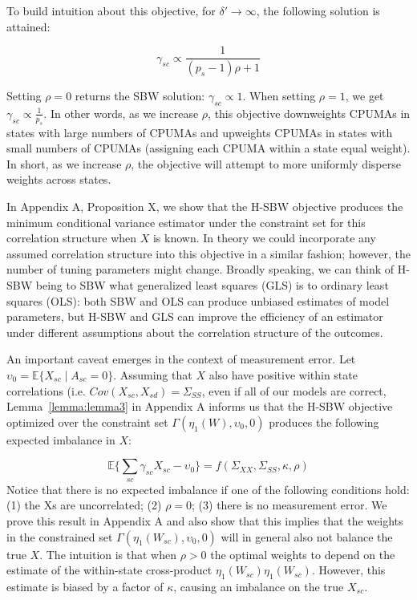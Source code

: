 \documentclass[aoas]{imsart}
\theoremstyle{plain}
\theoremstyle{remark}
\begin{document}
To build intuition about this objective, for $\delta' \to \infty$, the following solution is attained:

\begin{equation}\label{eqn:sbwsol}
\gamma_{sc} \propto \frac{1}{(p_s - 1)\rho + 1}
\end{equation}

Setting $\rho = 0$ returns the SBW solution: $\gamma_{sc} \propto 1$. When setting $\rho = 1$, we get $\gamma_{sc} \propto \frac{1}{p_s}$. In other words, as we increase $\rho$, this objective downweights CPUMAs in states with large numbers of CPUMAs and upweights CPUMAs in states with small numbers of CPUMAs (assigning each CPUMA within a state equal weight). In short, as we increase $\rho$, the objective will attempt to more uniformly disperse weights across states. 

In Appendix A, Proposition X, we show that the H-SBW objective produces the minimum conditional variance estimator under the constraint set for this correlation structure when $X$ is known. In theory we could incorporate any assumed correlation structure into this objective in a similar fashion; however, the number of tuning parameters might change. Broadly speaking, we can think of H-SBW being to SBW what generalized least squares (GLS) is to ordinary least squares (OLS): both SBW and OLS can produce unbiased estimates of model parameters, but H-SBW and GLS can improve the efficiency of an estimator under different assumptions about the correlation structure of the outcomes. 

An important caveat emerges in the context of measurement error. Let $\upsilon_0 = \mathbb{E}\{X_{sc} \mid A_{sc} = 0\}$. Assuming that $X$ also have positive within state correlations (i.e. $Cov(X_{sc}, X_{sd}) = \Sigma_{SS}$, even if all of our models are correct, Lemma~\ref{lemma:lemma3} in Appendix A informs us that the H-SBW objective optimized over the constraint set $\Gamma(\eta_1(W), \upsilon_0, 0)$ produces the following expected imbalance in $X$:

\begin{equation}
    \mathbb{E}\{\sum_{sc}\gamma_{sc}X_{sc} - \upsilon_0\} = f(\Sigma_{XX}, \Sigma_{SS}, \kappa, \rho)
\end{equation}
%
Notice that there is no expected imbalance if one of the following conditions hold: (1) the Xs are uncorrelated; (2) $\rho = 0$; (3) there is no measurement error. We prove this result in Appendix A and also show that this implies that the weights in the constrained set $\Gamma(\eta_1(W_{sc}), \upsilon_0, 0)$ will in general also not balance the true $X$. The intuition is that when $\rho > 0$ the optimal weights to depend on the estimate of the within-state cross-product $\eta_1(W_{sc})\eta_1(W_{sc})$. However, this estimate is biased by a factor of $\kappa$, causing an imbalance on the true $X_{sc}$.
\end{document}
